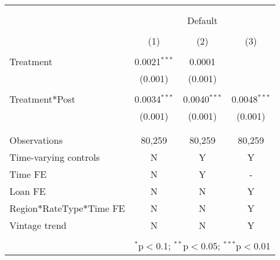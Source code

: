 
\begin{tabular}{@{\extracolsep{5pt}}lccc} 
\\[-1.8ex]\hline 
\hline \\[-1.8ex] 
\\[-1.8ex] & \multicolumn{3}{c}{Default} \\ 
\\[-1.8ex] & (1) & (2) & (3)\\ 
\hline \\[-1.8ex] 
 Treatment & 0.0021$^{***}$ & 0.0001 &  \\ 
  & (0.001) & (0.001) &  \\ 
  & & & \\ 
 Treatment$*$Post & 0.0034$^{***}$ & 0.0040$^{***}$ & 0.0048$^{***}$ \\ 
  & (0.001) & (0.001) & (0.001) \\ 
  & & & \\ 
\hline \\[-1.8ex] 
Observations & 80,259& 80,259 & 80,259 \\ 
\hline 
Time-varying controls & N & Y  & Y \\
Time FE & N & Y & -\\
Loan FE & N & N & Y \\
Region$*$RateType$*$Time FE& N & N & Y \\
Vintage trend & N & N & Y \\
\hline \\[-1.8ex] 
& \multicolumn{3}{r}{$^{*}$p$<$0.1; $^{**}$p$<$0.05; $^{***}$p$<$0.01} \\ 
\end{tabular} 
